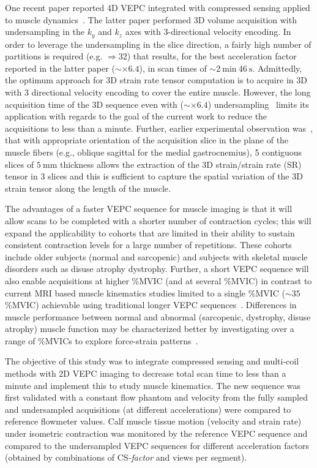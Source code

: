 One recent paper reported 4D VEPC integrated with compressed sensing applied to muscle dynamics~\cite{RNCS11}.
The latter paper performed 3D volume acquisition with undersampling in the $k_y$ and $k_z$ axes with 3-directional velocity encoding. 
In order to leverage the undersampling in the slice direction, a fairly high number of partitions is required (e.g. $\Rightarrow 32$) that results, for the best acceleration factor reported in the latter paper ($\sim \times 6.4$), in scan times of $\sim \SI{2}{\minute}~\SI{46}{\second}$. 
Admittedly, the optimum approach for 3D strain rate tensor computation is to acquire in 3D with 3 directional velocity encoding to cover the entire muscle. 
However, the long acquisition time of the 3D sequence even with ($\sim \times 6.4$) undersampling~\cite{RNCS11} limits its application with regards to the goal of the current work to reduce the acquisitions to less than a minute. 
Further, earlier experimental observation was~\cite{Malis:2018fr}, that with appropriate orientation of the acquisition slice in the plane of the muscle fibers (e.g., oblique sagittal for the medial gastrocnemius), 5 contiguous slices of $\SI{5}{\milli\meter}$ thickness allows the extraction of the 3D strain/strain rate (SR) tensor in 3 slices and this is sufficient to capture the spatial variation of the 3D strain tensor along the length of the muscle. 

The advantages of a faster VEPC sequence for muscle imaging is that it will allow scans to be completed with a shorter number of contraction cycles; this will expand the applicability to cohorts that are limited in their ability to sustain consistent contraction levels for a large number of repetitions. 
These cohorts include older subjects (normal and sarcopenic) and subjects with skeletal muscle disorders such as disuse atrophy dystrophy. 
Further, a short VEPC sequence will also enable acquisitions at higher \%MVIC (and at several \%MVIC) in contrast to current MRI based muscle kinematics studies limited to a single \%MVIC ($\sim 35$\%MVIC) achievable using traditional longer VEPC sequences~\cite{RNS16, Malis:2018fr}. 
Differences in muscle performance between normal and abnormal (sarcopenic, dystrophy, disuse atrophy) muscle function may be characterized better by investigating over a range of \%MVICs to explore force-strain patterns~\cite{RNCS12}. 

The objective of this study was to integrate compressed sensing and multi-coil methods with 2D VEPC imaging to decrease total scan time to less than a minute and implement this to study muscle kinematics. 
The new sequence was first validated with a constant flow phantom and velocity from the fully sampled and undersampled acquisitions (at different accelerations) were compared to reference flowmeter values. 
Calf muscle tissue motion (velocity and strain rate) under isometric contraction was monitored by the reference VEPC sequence and compared to the undersampled VEPC sequences for different acceleration factors (obtained by combinations of \mbox{CS\textit{-factor}} and views per segment).
